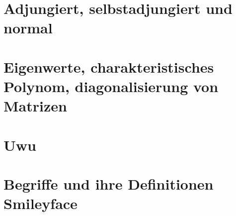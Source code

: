 \documentclass{scrartcl}
\begin{document}
\section{Adjungiert, selbstadjungiert und normal}

\section{Eigenwerte, charakteristisches Polynom, diagonalisierung von Matrizen}

\section{Uwu}

\section{Begriffe und ihre Definitionen Smileyface}

\end{document}
